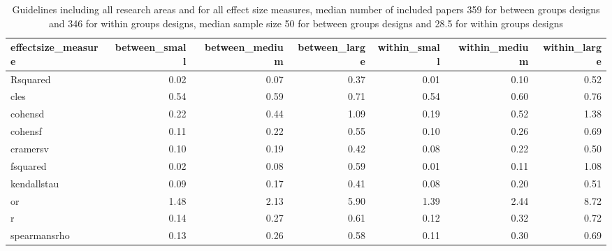 \begin{table}[ht]
\centering
\begin{tabular}{lrrrrrr}
  \hline
effectsize\_measure & between\_small & between\_medium & between\_large & within\_small & within\_medium & within\_large \\ 
  \hline
Rsquared & 0.02 & 0.07 & 0.37 & 0.01 & 0.10 & 0.52 \\ 
  cles & 0.54 & 0.59 & 0.71 & 0.54 & 0.60 & 0.76 \\ 
  cohensd & 0.22 & 0.44 & 1.09 & 0.19 & 0.52 & 1.38 \\ 
  cohensf & 0.11 & 0.22 & 0.55 & 0.10 & 0.26 & 0.69 \\ 
  cramersv & 0.10 & 0.19 & 0.42 & 0.08 & 0.22 & 0.50 \\ 
  fsquared & 0.02 & 0.08 & 0.59 & 0.01 & 0.11 & 1.08 \\ 
  kendallstau & 0.09 & 0.17 & 0.41 & 0.08 & 0.20 & 0.51 \\ 
  or & 1.48 & 2.13 & 5.90 & 1.39 & 2.44 & 8.72 \\ 
  r & 0.14 & 0.27 & 0.61 & 0.12 & 0.32 & 0.72 \\ 
  spearmansrho & 0.13 & 0.26 & 0.58 & 0.11 & 0.30 & 0.69 \\ 
   \hline
\end{tabular}
\caption{Guidelines including all research areas and for all effect size measures, median number of included papers 359 for between groups designs and 346 for within groups designs, median sample size 50 for between groups designs and 28.5 for within groups designs} 
\label{tab:es guidelines all-es all-topics}
\end{table}

